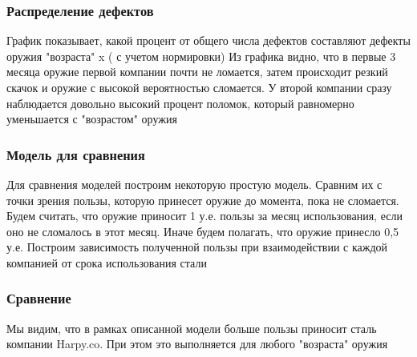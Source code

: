 \documentclass[8pt]{beamer}
\begin{document}
\begin{frame}
\frametitle{Распределение дефектов }
\begin{figure}[h]
\end{figure}
График показывает, какой процент от общего числа дефектов составляют дефекты оружия "возраста" x ( с учетом нормировки)
Из графика видно, что в первые 3 месяца оружие первой компании почти не ломается, затем происходит резкий скачок и оружие с высокой вероятностью сломается. У второй компании сразу наблюдается довольно высокий процент поломок, который равномерно уменьшается с "возрастом" оружия

\end{frame}



\begin{frame}

\frametitle{Модель для сравнения\\}
Для сравнения моделей построим некоторую простую модель. Сравним их с точки зрения пользы, которую принесет оружие до момента, пока не сломается. Будем считать, что оружие приносит 1 у.е. пользы за месяц использования, если оно не сломалось в этот месяц. Иначе будем полагать, что оружие принесло 0,5 у.е. Построим зависимость полученной пользы при взаимодействии с каждой компанией от срока использования стали


\end{frame}


\begin{frame}
\frametitle{Сравнение\\}
\begin{figure}[h]
\end{figure}
\bigskip
 Мы видим, что в рамках описанной модели больше пользы приносит сталь компании Harpy.co. При этом это выполняется для любого "возраста" оружия


\end{frame}
\end{document}
